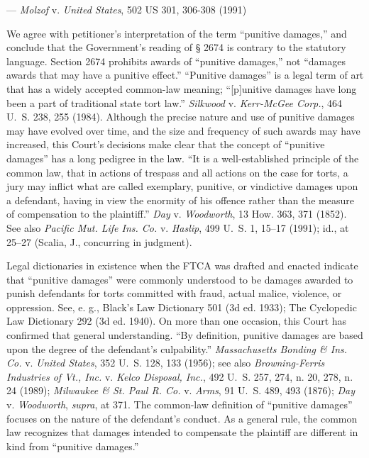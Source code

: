 \setupleglipsum
{ --- \textit{Molzof} v. \textit{United States}, 502 US 301, 306-308 (1991)}
{
We agree with petitioner’s interpretation of the term “punitive
damages,” and conclude that the Government’s reading
of § 2674 is contrary to the statutory language. Section
2674 prohibits awards of “punitive damages,” not “damages
awards that may have a punitive effect.” “Punitive damages”
is a legal term of art that has a widely accepted
common-law meaning; “[p]unitive damages have long been a
part of traditional state tort law.” \textit{Silkwood} v. \textit{Kerr-McGee
Corp.}, 464 U.~S. 238, 255 (1984). Although the precise nature
and use of punitive damages may have evolved over time,
and the size and frequency of such awards may have increased,
this Court’s decisions make clear that the concept
of “punitive damages” has a long pedigree in the law. “It is
a well-established principle of the common law, that in actions
of trespass and all actions on the case for torts, a jury
may inflict what are called exemplary, punitive, or vindictive
damages upon a defendant, having in view the enormity of
his offence rather than the measure of compensation to the
plaintiff.” \textit{Day} v. \textit{Woodworth}, 13 How. 363, 371 (1852). See
also \textit{Pacific Mut. Life Ins. Co.} v. \textit{Haslip}, 499 U.~S. 1, 15–17
(1991); id., at 25–27 (Scalia, J., concurring in judgment).\par
Legal dictionaries in existence when the FTCA was
drafted and enacted indicate that “punitive damages” were
commonly understood to be damages awarded to punish defendants
for torts committed with fraud, actual malice, violence,
or oppression. See, e. g., Black’s Law Dictionary 501
(3d ed. 1933); The Cyclopedic Law Dictionary 292 (3d ed.
1940). On more than one occasion, this Court has confirmed
that general understanding. “By definition, punitive damages
are based upon the degree of the defendant’s culpability.”
\textit{Massachusetts Bonding \& Ins. Co.} v. \textit{United States},
352 U.~S. 128, 133 (1956); see also \textit{Browning-Ferris Industries
of Vt., Inc.} v. \textit{Kelco Disposal, Inc.}, 492 U.~S. 257, 274,
n. 20, 278, n. 24 (1989); \textit{Milwaukee \& St. Paul R. Co.} v. \textit{Arms},
91 U.~S. 489, 493 (1876); \textit{Day} v. \textit{Woodworth}, \textit{supra}, at 371.
The common-law definition of “punitive damages” focuses on
the nature of the defendant’s conduct. As a general rule,
the common law recognizes that damages intended to compensate
the plaintiff are different in kind from “punitive
damages.”\par
}
